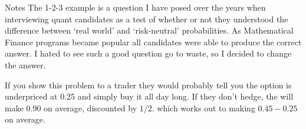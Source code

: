 \begin{section}{Notes}
The 1-2-3 example is a question I have posed over the years when interviewing
quant candidates as a test of whether
or not they understood the difference between
`real world' and `risk-neutral' probabilities. 
As Mathematical Finance programs became popular
all candidates were able to produce the correct answer.
I hated to see such a good question go to waste,
so I decided to change the answer. 

If you show this problem to a trader they would probably tell you the
option is underpriced at 0.25 and simply buy it all day long. If
they don't hedge, the will make 0.90 on average, discounted by
$1/2$. which works out to making $0.45 - 0.25$ on average. 

\end{section}